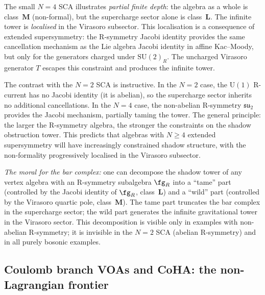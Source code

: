 \begin{remark}
\label{rem:N4-partial-formality}
The small $N{=}4$ SCA illustrates
\emph{partial finite depth}: the algebra as a whole is
class~$\mathbf{M}$ (non-formal), but the supercharge sector
alone is class~$\mathbf{L}$. The infinite tower is
\emph{localised} in the Virasoro subsector. This localisation is a
consequence of extended supersymmetry: the R-symmetry Jacobi
identity provides the same cancellation mechanism as the Lie algebra
Jacobi identity in affine Kac--Moody, but only for the generators
charged under $\mathrm{SU}(2)_R$. The uncharged Virasoro generator
$T$ escapes this constraint and produces the infinite tower.

The contrast with the $N{=}2$ SCA is instructive. In the $N{=}2$
case, the $\mathrm{U}(1)$ R-current has no Jacobi identity (it is
abelian), so the supercharge sector inherits no additional
cancellations. In the $N{=}4$ case, the non-abelian R-symmetry
$\mathfrak{su}_2$ provides the Jacobi mechanism, partially taming
the tower. The general principle: the larger the R-symmetry
algebra, the stronger the constraints on the shadow obstruction tower.
This predicts that algebras with $N \ge 4$ extended supersymmetry
will have increasingly constrained shadow structure, with the
non-formality progressively localised in the Virasoro subsector.

\emph{The moral for the bar complex:} one can decompose the shadow
tower of any vertex algebra with an R-symmetry subalgebra
$\fg_R$ into a ``tame'' part (controlled by the Jacobi identity
of $\fg_R$, class~$\mathbf{L}$) and a ``wild'' part (controlled
by the Virasoro quartic pole, class~$\mathbf{M}$). The tame
part truncates the bar complex in the supercharge sector;
the wild part generates the infinite gravitational tower in
the Virasoro sector. This decomposition is
visible only in examples with non-abelian R-symmetry;
it is invisible in the $N{=}2$ SCA (abelian R-symmetry)
and in all purely bosonic examples.
\end{remark}


%
%

\subsection{Coulomb branch VOAs and CoHA: the non-Lagrangian frontier}
\label{subsec:coulomb-coha}

